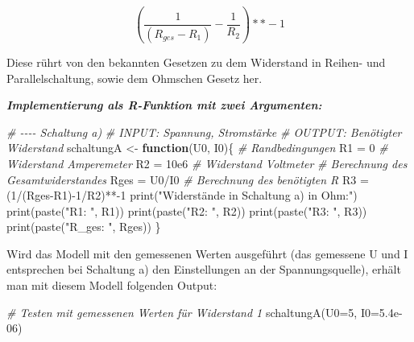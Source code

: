 \documentclass[class=article, crop=false]{standalone}
\newenvironment{Shaded}{\begin{snugshade}}{\end{snugshade}}
\newcommand{\AttributeTok}[1]{\textcolor[rgb]{0.77,0.63,0.00}{#1}}
\newcommand{\CommentTok}[1]{\textcolor[rgb]{0.56,0.35,0.01}{\textit{#1}}}
\newcommand{\ControlFlowTok}[1]{\textcolor[rgb]{0.13,0.29,0.53}{\textbf{#1}}}
\newcommand{\DecValTok}[1]{\textcolor[rgb]{0.00,0.00,0.81}{#1}}
\newcommand{\FloatTok}[1]{\textcolor[rgb]{0.00,0.00,0.81}{#1}}
\newcommand{\FunctionTok}[1]{\textcolor[rgb]{0.00,0.00,0.00}{#1}}
\newcommand{\NormalTok}[1]{#1}
\newcommand{\OtherTok}[1]{\textcolor[rgb]{0.56,0.35,0.01}{#1}}
\newcommand{\SpecialCharTok}[1]{\textcolor[rgb]{0.00,0.00,0.00}{#1}}
\newcommand{\StringTok}[1]{\textcolor[rgb]{0.31,0.60,0.02}{#1}}
\begin{document}
\[(\frac{1}{(R_{ges}-R_1)}-\frac{1}{R_2})**-1\]

Diese rührt von den bekannten Gesetzen zu dem Widerstand in Reihen- und
Parallelschaltung, sowie dem Ohmschen Gesetz her.

\textbf{\emph{Implementierung als R-Funktion mit zwei Argumenten:}}

\begin{Shaded}
\begin{Highlighting}[]
\CommentTok{\# {-}{-}{-}{-} Schaltung a)}
\CommentTok{\# INPUT: Spannung, Stromstärke}
\CommentTok{\# OUTPUT: Benötigter Widerstand}
\NormalTok{schaltungA }\OtherTok{\textless{}{-}} \ControlFlowTok{function}\NormalTok{(U0, I0)\{}
  \CommentTok{\# Randbedingungen}
\NormalTok{  R1 }\OtherTok{=} \DecValTok{0} \CommentTok{\# Widerstand Amperemeter}
\NormalTok{  R2 }\OtherTok{=} \FloatTok{10e6} \CommentTok{\# Widerstand Voltmeter}
  \CommentTok{\# Berechnung des Gesamtwiderstandes}
\NormalTok{  Rges }\OtherTok{=}\NormalTok{ U0}\SpecialCharTok{/}\NormalTok{I0}
  \CommentTok{\# Berechnung des benötigten R}
\NormalTok{  R3 }\OtherTok{=}\NormalTok{ (}\DecValTok{1}\SpecialCharTok{/}\NormalTok{(Rges}\SpecialCharTok{{-}}\NormalTok{R1)}\SpecialCharTok{{-}}\DecValTok{1}\SpecialCharTok{/}\NormalTok{R2)}\SpecialCharTok{**{-}}\DecValTok{1}
  \FunctionTok{print}\NormalTok{(}\StringTok{"Widerstände in Schaltung a) in Ohm:"}\NormalTok{)}
  \FunctionTok{print}\NormalTok{(}\FunctionTok{paste}\NormalTok{(}\StringTok{"R1: "}\NormalTok{, R1))}
  \FunctionTok{print}\NormalTok{(}\FunctionTok{paste}\NormalTok{(}\StringTok{"R2: "}\NormalTok{, R2))}
  \FunctionTok{print}\NormalTok{(}\FunctionTok{paste}\NormalTok{(}\StringTok{"R3: "}\NormalTok{, R3))}
  \FunctionTok{print}\NormalTok{(}\FunctionTok{paste}\NormalTok{(}\StringTok{"R\_ges: "}\NormalTok{, Rges))}
\NormalTok{\}}
\end{Highlighting}
\end{Shaded}

Wird das Modell mit den gemessenen Werten ausgeführt (das gemessene U
und I entsprechen bei Schaltung a) den Einstellungen an der
Spannungsquelle), erhält man mit diesem Modell folgenden Output:

\begin{Shaded}
\begin{Highlighting}[]
\CommentTok{\# Testen mit gemessenen Werten für Widerstand 1}
\FunctionTok{schaltungA}\NormalTok{(}\AttributeTok{U0=}\DecValTok{5}\NormalTok{, }\AttributeTok{I0=}\FloatTok{5.4e{-}06}\NormalTok{)}
\end{Highlighting}
\end{Shaded}
\end{document}
